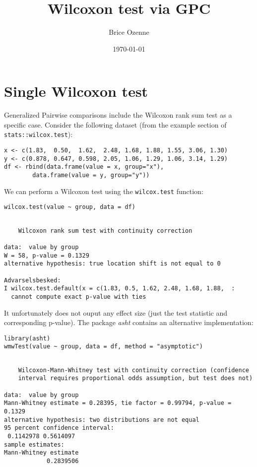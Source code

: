 \documentclass[12pt]{article}
\author{Brice Ozenne}
\date{\today}
\title{Wilcoxon test via GPC}
\begin{document}
\maketitle

\section{Single Wilcoxon test}
\label{sec:org1e74dc3}

Generalized Pairwise comparisons include the Wilcoxon rank sum test as
a specific case. \newline Consider the following dataset (from the example
section of \texttt{stats::wilcox.test}):
\lstset{language=r,label= ,caption= ,captionpos=b,numbers=none}
\begin{lstlisting}
x <- c(1.83,  0.50,  1.62,  2.48, 1.68, 1.88, 1.55, 3.06, 1.30)
y <- c(0.878, 0.647, 0.598, 2.05, 1.06, 1.29, 1.06, 3.14, 1.29)
df <- rbind(data.frame(value = x, group="x"),
	    data.frame(value = y, group="y"))
\end{lstlisting}

We can perform a Wilcoxon test using the \texttt{wilcox.test} function:
\lstset{language=r,label= ,caption= ,captionpos=b,numbers=none}
\begin{lstlisting}
wilcox.test(value ~ group, data = df)
\end{lstlisting}

\begin{verbatim}

	Wilcoxon rank sum test with continuity correction

data:  value by group
W = 58, p-value = 0.1329
alternative hypothesis: true location shift is not equal to 0

Advarselsbesked:
I wilcox.test.default(x = c(1.83, 0.5, 1.62, 2.48, 1.68, 1.88,  :
  cannot compute exact p-value with ties
\end{verbatim}

It unfortunately does not ouput any effect size (just the test
statistic and corresponding p-value). The package \emph{asht} contains an
alternative implementation:
\lstset{language=r,label= ,caption= ,captionpos=b,numbers=none}
\begin{lstlisting}
library(asht)
wmwTest(value ~ group, data = df, method = "asymptotic")
\end{lstlisting}

\begin{verbatim}

	Wilcoxon-Mann-Whitney test with continuity correction (confidence
	interval requires proportional odds assumption, but test does not)

data:  value by group
Mann-Whitney estimate = 0.28395, tie factor = 0.99794, p-value = 0.1329
alternative hypothesis: two distributions are not equal
95 percent confidence interval:
 0.1142978 0.5614097
sample estimates:
Mann-Whitney estimate 
            0.2839506
\end{verbatim}
\end{document}

